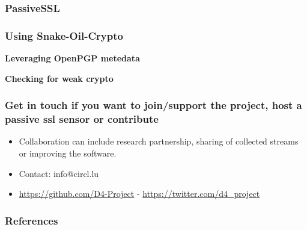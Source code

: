 \documentclass{beamer}
\begin{document}
\begin{frame}
  \frametitle{PassiveSSL}
\end{frame}

\begin{frame}
  \frametitle{Using Snake-Oil-Crypto}
\end{frame}

\begin{frame}
  \begin{center}
    {\bf Leveraging OpenPGP metedata}
  \end{center}
\end{frame}

\begin{frame}
  \begin{center}
    {\bf Checking for weak crypto}
  \end{center}
\end{frame}


\begin{frame}
\frametitle{Get in touch if you want to join/support the project, host a passive ssl sensor or contribute}
\begin{itemize}
\item Collaboration can include research partnership, sharing of collected streams or improving the software.
\item Contact: info@circl.lu
\item \url{https://github.com/D4-Project} -  \url{https://twitter.com/d4_project}
\end{itemize}
\end{frame}



\nocite{*} 
\begin{frame}[allowframebreaks]
        \frametitle{References}
        
        
\end{frame}
\end{document}
